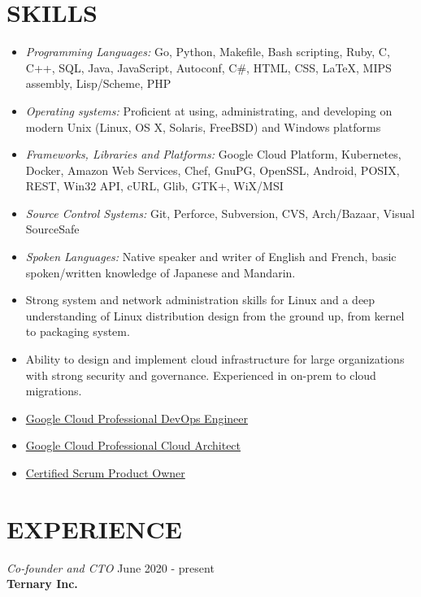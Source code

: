 \documentclass[overlapped,line,margin]{res}
\begin{document}
\begin{resume}
\section{SKILLS}
\begin{itemize}
\item \textit{Programming Languages:} 
  Go, Python, Makefile, Bash scripting, Ruby, C, C++, SQL, Java, JavaScript,
  Autoconf, C\#, HTML, CSS, \LaTeX, MIPS assembly, Lisp/Scheme, PHP
\item \textit{Operating systems:}
  Proficient at using, administrating, and developing on modern Unix (Linux,
  OS X, Solaris, FreeBSD) and Windows platforms
\item \textit{Frameworks, Libraries and Platforms:}
  Google Cloud Platform, Kubernetes, Docker, Amazon Web Services, Chef,
  GnuPG, OpenSSL, Android, POSIX, REST, Win32 API, cURL, Glib, GTK+, WiX/MSI
\item \textit{Source Control Systems:}
  Git, Perforce, Subversion, CVS, Arch/Bazaar, Visual SourceSafe
\item \textit{Spoken Languages:}
  Native speaker and writer of English and French,
  basic spoken/written knowledge of Japanese and Mandarin.
\item Strong system and network administration skills for Linux and a
  deep understanding of Linux distribution design from the ground up, from
  kernel to packaging system.
\item Ability to design and implement cloud infrastructure for large
  organizations with strong security and governance. Experienced in
  on-prem to cloud migrations.
\item \href{https://www.credential.net/cd3db6be-f769-4350-96fa-1d782c3f30fb?key=04b38dbf7ab7c0b9672ca5e04b9dd3b0d196b34f5a3b588bffb7d804bd547add}{Google Cloud Professional DevOps Engineer}
\item \href{https://www.credential.net/d61c9e7b-bc7d-4861-9dfe-a6aed8b542d3?key=da80861799e43a3181cb466ca22ecc3ed17d34d42422c40b4b834299d62dabaa}{Google Cloud Professional Cloud Architect}
\item \href{http://bcert.me/sfcqbkgtf}{Certified Scrum Product Owner}
\end{itemize}

\section{EXPERIENCE}
\textit{Co-founder and CTO} \hfill June 2020 - present \\
\textbf{Ternary Inc.}


\end{resume}
\end{document}
